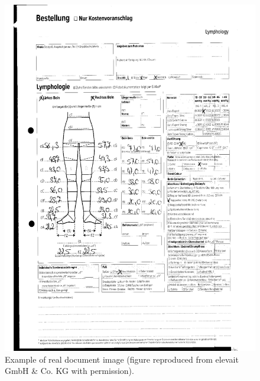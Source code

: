 \begin{figure}[H]
        \vspace*{2cm}
        \begin{center}
	    \includegraphics[scale=0.43]{images/Appendix/RealImage.png}
	    \caption[Example of real document image.]{Example of real document image (figure reproduced from elevait GmbH \& Co. KG with permission).}
	    \label{fig:RealImage}
	    \end{center}
\end{figure}

